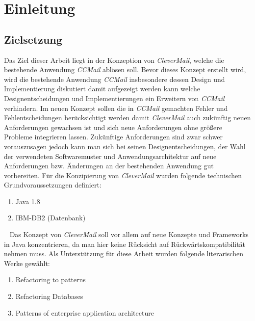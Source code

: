 \chapter{Einleitung}
\label{cha:einleitung}
\section{Zielsetzung}
\label{sec:zielsetzung}
Das Ziel dieser Arbeit liegt in der Konzeption von \emph{CleverMail}, welche die bestehende Anwendung \emph{CCMail} ablösen soll. Bevor dieses Konzept erstellt wird, wird die bestehende Anwendung \emph{CCMail} insbesondere dessen Design und Implementierung diskutiert damit aufgezeigt werden kann welche \newline
Designentscheidungen und Implementierungen ein Erweitern von \emph{CCMail} verhindern. Im neuen Konzept sollen die in \emph{CCMail} gemachten Fehler und Fehlentscheidungen berücksichtigt werden damit \emph{CleverMail} auch \newline
zukünftig neuen Anforderungen gewachsen ist und sich neue Anforderungen ohne größere Probleme integrieren lassen. Zukünftige Anforderungen sind zwar schwer vorauszusagen jedoch kann man sich bei seinen Designentscheidungen, der Wahl der verwendeten Softwaremuster und Anwendungsarchitektur auf neue Anforderungen bzw. Änderungen an der bestehenden Anwendung gut vorbereiten.
\newline\newline
Für die Konzipierung von \emph{CleverMail} wurden folgende technischen Grundvoraussetzungen definiert:
\begin{enumerate}
	\item Java 1.8
	\item IBM-DB2 (Datenbank)
\end{enumerate}
\ \newline
Das Konzept von \emph{CleverMail} soll vor allem auf neue Konzepte und Frameworks in Java konzentrieren, da man hier keine Rücksicht auf Rückwärtskompatibilität nehmen muss. 
\newpage
Als Unterstützung für diese Arbeit wurden folgende literarischen Werke gewählt:
\begin{enumerate}
	\item Refactoring to patterns\cite{refactoreDatabase}
	\item Refactoring Databases\cite{refactoreToPatterns}
	\item Patterns of enterprise application architecture\cite{patternsOfEnterprise}
\end{enumerate}
\ \newline
